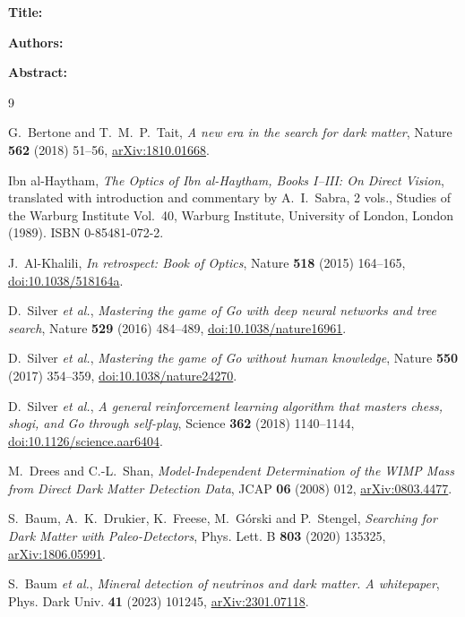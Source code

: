 \documentclass[11pt]{article}
\newcommand{\papercard}{%
  \begin{tcolorbox}[colback=cyan!4,colframe=cyan!45!black,
                    title={Page metadata: the paper (not printed on the page)}]
  \textbf{Title:} \thepapertitle\par\smallskip
  \textbf{Authors:} \thepaperauthors
  \begin{enumerate}\itemsep0pt \thepaperaffil \end{enumerate}
  \textbf{Abstract:} \thepaperabstract
  \end{tcolorbox}}
\begin{document}
\papercard

\begin{thebibliography}{9}

G.~Bertone and T.~M.~P.~Tait, \emph{A new era in the search for dark matter},
Nature \textbf{562} (2018) 51--56,
\href{https://arxiv.org/abs/1810.01668}{arXiv:1810.01668}.

Ibn al-Haytham, \emph{The Optics of Ibn al-Haytham, Books I--III: On Direct
Vision}, translated with introduction and commentary by A.~I.~Sabra, 2 vols.,
Studies of the Warburg Institute Vol.~40, Warburg Institute, University of
London, London (1989). ISBN 0-85481-072-2.

J.~Al-Khalili, \emph{In retrospect: Book of Optics}, Nature \textbf{518}
(2015) 164--165, \href{https://doi.org/10.1038/518164a}{doi:10.1038/518164a}.

D.~Silver \emph{et al.}, \emph{Mastering the game of Go with deep neural
networks and tree search}, Nature \textbf{529} (2016) 484--489,
\href{https://doi.org/10.1038/nature16961}{doi:10.1038/nature16961}.

D.~Silver \emph{et al.}, \emph{Mastering the game of Go without human
knowledge}, Nature \textbf{550} (2017) 354--359,
\href{https://doi.org/10.1038/nature24270}{doi:10.1038/nature24270}.

D.~Silver \emph{et al.}, \emph{A general reinforcement learning algorithm that
masters chess, shogi, and Go through self-play}, Science \textbf{362} (2018)
1140--1144,
\href{https://doi.org/10.1126/science.aar6404}{doi:10.1126/science.aar6404}.

M.~Drees and C.-L.~Shan, \emph{Model-Independent Determination of the WIMP Mass
from Direct Dark Matter Detection Data}, JCAP \textbf{06} (2008) 012,
\href{https://arxiv.org/abs/0803.4477}{arXiv:0803.4477}.

S.~Baum, A.~K.~Drukier, K.~Freese, M.~G\'orski and P.~Stengel,
\emph{Searching for Dark Matter with Paleo-Detectors}, Phys. Lett. B
\textbf{803} (2020) 135325,
\href{https://arxiv.org/abs/1806.05991}{arXiv:1806.05991}.

S.~Baum \emph{et al.}, \emph{Mineral detection of neutrinos and dark matter. A
whitepaper}, Phys. Dark Univ. \textbf{41} (2023) 101245,
\href{https://arxiv.org/abs/2301.07118}{arXiv:2301.07118}.


\end{thebibliography}
\end{document}
